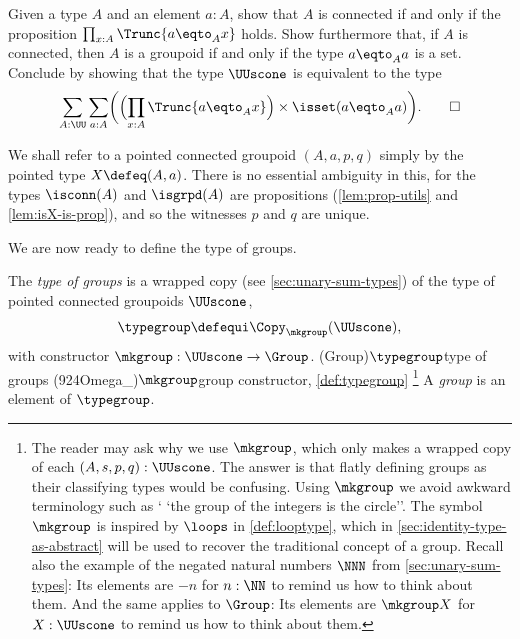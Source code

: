 \begin{xca}\label{xca:defgroup}
  Given a type $A$ and an element $a:A$, 
  show that $A$ is connected if and only if the proposition 
  $\prod_{x:A}\Trunc{a \eqto_A x}$ holds. 
  Show furthermore that, if $A$ is connected, then $A$ is a groupoid 
  if and only if the type $a\eqto_A a$ is a set.
  Conclude by showing that the type $\UUscone$ is equivalent to the type
  \[
    \sum_{A:\UU} \sum_{a:A} \biggl( \Bigl( \prod_{x:A}\Trunc{a \eqto_A x} \Bigr)
      \times \isset( a\eqto_A a ) \biggr).\qedhere
  \]
\end{xca}

\begin{remark}
  We shall refer to a pointed connected groupoid $(A,a,p,q)$ simply
  by the pointed type $X \defeq (A,a)$.
  There is no essential ambiguity in this, for
  the types $\isconn(A)$ and $\isgrpd(A)$ are propositions 
  (\cref{lem:prop-utils} and \cref{lem:isX-is-prop}),
  and so the witnesses $p$ and $q$ are unique.
\end{remark}

We are now ready to define the type of groups.

\begin{definition}\label{def:typegroup}
  The \emph{type of groups} is a wrapped copy (see \cref{sec:unary-sum-types})
  of the type of pointed connected groupoids $\UUscone$,
  \[
    \typegroup \defequi \Copy_{\mkgroup}(\UUscone),
  \]
  with constructor $\mkgroup : \UUscone \to \Group$.%
  \glossary(Group){$\protect\typegroup$}{type of groups}
  \glossary(924Omega_){$\protect\mkgroup$}{group constructor,
  \cref{def:typegroup}}%
  \footnote{%
  The reader may ask why we use $\mkgroup$, which only makes a wrapped
  copy of each $(A,s,p,q): \UUscone$. The answer is that flatly defining
  groups as their classifying types would be confusing.
  Using $\mkgroup$ we avoid awkward terminology such as `
  `the group of the integers is the circle''. 
  The symbol $\mkgroup$ is inspired by $\loops$
  in \cref{def:looptype}, which in \cref{sec:identity-type-as-abstract}
  will be used to recover the traditional concept of a group.
  Recall also the example of the negated natural numbers $\NNN$
  from \cref{sec:unary-sum-types}:
  Its elements are $-n$ for $n:\NN$ to remind us how to think about them.
  And the same applies to $\Group$:
  Its elements are $\mkgroup X$ for $X : \UUscone$
  to remind us how to think about them.
  }
  A \emph{group} is an element of $\typegroup$.
\end{definition}

